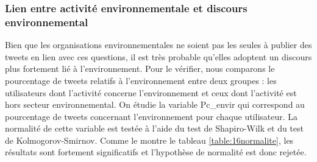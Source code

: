 



        \subsubsection{Lien entre activité environnementale et discours environnemental}
        Bien que les organisations environnementales ne soient pas les seules à publier des tweets en lien avec ces questions, il est très probable qu’elles adoptent un discours plus fortement lié à l’environnement. Pour le vérifier, nous comparons le pourcentage de tweets relatifs à l’environnement entre deux groupes : les utilisateurs dont l’activité concerne l’environnement et ceux dont l’activité est hors secteur environnemental. On étudie la variable Pc\_envir qui correspond au pourcentage de tweets concernant l’environnement pour chaque utilisateur. La normalité de cette variable est testée à l’aide du test de Shapiro-Wilk et du test de Kolmogorov-Smirnov. Comme le montre le tableau \ref{table:16normalite}, les résultats sont fortement significatifs et l’hypothèse de normalité est donc rejetée. \\


